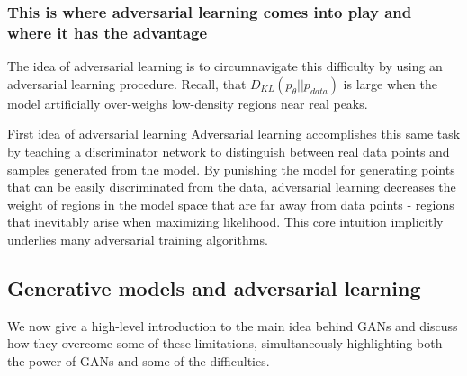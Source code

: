 \subsubsection{This is where adversarial learning comes into play and where it has the advantage}
The idea of adversarial learning is to circumnavigate this difficulty by using an adversarial learning procedure.  Recall, that $D_{KL}(p_\theta ||p_{data})$ is large when the model artificially over-weighs low-density regions near real peaks.
\begin{mybox}{First idea of adversarial learning}
	Adversarial learning accomplishes this same task by teaching a discriminator network to distinguish between real data points and samples generated from the model. By punishing the model for generating points that can be easily discriminated from the data, adversarial learning decreases the weight of regions in the model space that are far away from data points - regions that inevitably arise when maximizing likelihood. This core intuition implicitly underlies many adversarial training algorithms.
\end{mybox}


\subsection{Generative models and adversarial learning}
\label{subsec:vaeGanAdversarial}
We now give a high-level introduction to the main idea behind GANs and discuss how they overcome some of these limitations, simultaneously highlighting both the power of GANs and some of the difficulties.






